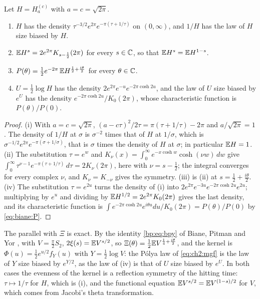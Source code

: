 \begin{proposition}\label{prop:biane:mellin}
Let $H=H^{(c)}_a$ with $a=c=\sqrt{2\pi}$.
\begin{enumerate}
\item[(i)] $H$ has the density $\tau^{-3/2}e^{2\pi}e^{-\pi(\tau+1/\tau)}$ on $(0,\infty)$, and $1/H$ has the law of $H$ size biased by $H$.
\item[(ii)] $\mathbb{E} H^s=2e^{2\pi}K_{s-\frac12}(2\pi)$ for every $s\in\mathbb{C}$, so that $\mathbb{E} H^s=\mathbb{E} H^{1-s}$.
\item[(iii)] $P(\theta)=\frac12e^{-2\pi}\,\mathbb{E} H^{\frac12+\frac{i\theta}2}$ for every $\theta\in\mathbb{C}$.
\item[(iv)] $U=\frac12\log H$ has the density $2e^{2\pi}e^{-u}e^{-2\pi\cosh2u}$, and the law of $U$ size biased by $e^U$ has the density $e^{-2\pi\cosh2u}/K_0(2\pi)$, whose characteristic function is $P(\theta)/P(0)$.
\end{enumerate}
\end{proposition}

\begin{proof}
(i) With $a=c=\sqrt{2\pi}$, $(a-c\tau)^2/2\tau=\pi(\tau+1/\tau)-2\pi$ and $a/\sqrt{2\pi}=1$. The density of $1/H$ at $\sigma$ is $\sigma^{-2}$ times that of $H$ at $1/\sigma$, which is $\sigma^{-1/2}e^{2\pi}e^{-\pi(\sigma+1/\sigma)}$, that is $\sigma$ times the density of $H$ at $\sigma$; in particular $\mathbb{E} H=1$. (ii) The substitution $\tau=e^w$ and $K_\nu(x)=\int_0^\infty e^{-x\cosh w}\cosh(\nu w)\,dw$ \cite[(10.32.9)]{DLMF} give $\int_0^\infty\tau^{\nu-1}e^{-\pi(\tau+1/\tau)}\,d\tau=2K_\nu(2\pi)$, here with $\nu=s-\frac12$; the integral converges for every complex $\nu$, and $K_\nu=K_{-\nu}$ gives the symmetry. (iii) is (ii) at $s=\frac12+\frac{i\theta}2$. (iv) The substitution $\tau=e^{2u}$ turns the density of (i) into $2e^{2\pi}e^{-3u}e^{-2\pi\cosh2u}e^{2u}$; multiplying by $e^u$ and dividing by $\mathbb{E} H^{1/2}=2e^{2\pi}K_0(2\pi)$ gives the last density, and its characteristic function is $\int e^{-2\pi\cosh2u}e^{i\theta u}du/K_0(2\pi)=P(\theta)/P(0)$ by \eqref{eq:biane:P}.
\end{proof}

The parallel with $\Xi$ is exact. By the identity \eqref{bp:eq:bpy} of Biane, Pitman and Yor \cite{BPY01}, with $V=\frac\pi2S_2$, $2\xi(s)=\mathbb{E} V^{s/2}$, so $\Xi(\theta)=\frac12\mathbb{E} V^{\frac14+\frac{i\theta}2}$, and the kernel is $\Phi(u)=\frac12e^{u/2}f_Y(u)$ with $Y=\frac12\log V$: the P\'olya law of \eqref{eq:ch2:mgf} is the law of $Y$ size biased by $e^{Y/2}$, as the law of (iv) is that of $U$ size biased by $e^U$. In both cases the evenness of the kernel is a reflection symmetry of the hitting time: $\tau\mapsto1/\tau$ for $H$, which is (i), and the functional equation $\mathbb{E} V^{s/2}=\mathbb{E} V^{(1-s)/2}$ for $V$, which comes from Jacobi's theta transformation.

